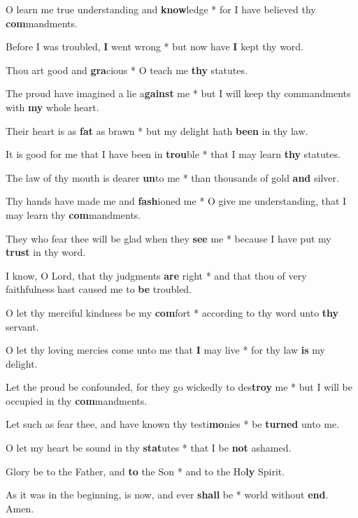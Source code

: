 \begin{multicols}{2}
	O learn me true understanding and \textbf{know}ledge * for I have believed thy \textbf{com}mandments.
	
	Before I was troubled, \textbf{I} went wrong * but now have \textbf{I} kept thy word.
	
	Thou art good and \textbf{gra}cious * O teach me \textbf{thy} statutes.
	
	The proud have imagined a lie a\textbf{gainst} me * but I will keep thy commandments with \textbf{my} whole heart.
	
	Their heart is as \textbf{fat} as brawn * but my delight hath \textbf{been} in thy law.
	
	It is good for me that I have been in \textbf{trou}ble * that I may learn \textbf{thy} statutes.
	
	The law of thy mouth is dearer \textbf{un}to me * than thousands of gold \textbf{and} silver.
	
	Thy hands have made me and \textbf{fash}ioned me * O give me understanding, that I may learn thy \textbf{com}mandments.
	
	They who fear thee will be glad when they \textbf{see} me * because I have put my \textbf{trust} in thy word.
	
	I know, O Lord, that thy judgments \textbf{are} right * and that thou of very faithfulness hast caused me to \textbf{be} troubled.
	
	O let thy merciful kindness be my \textbf{com}fort * according to thy word unto \textbf{thy} servant.
	
	O let thy loving mercies come unto me that \textbf{I} may live * for thy law \textbf{is} my delight.
	
	Let the proud be confounded, for they go wickedly to des\textbf{troy} me * but I will be occupied in thy \textbf{com}mandments.
	
	Let such as fear thee, and have known thy testi\textbf{mo}nies * be \textbf{turned} unto me.
	
	O let my heart be sound in thy \textbf{stat}utes * that I be \textbf{not} ashamed.
	
	Glory be to the Father, and \textbf{to} the Son * and to the Ho\textbf{ly} Spirit.
	
	As it was in the beginning, is now, and ever \textbf{shall} be * world without \textbf{end}. Amen.
\end{multicols}
